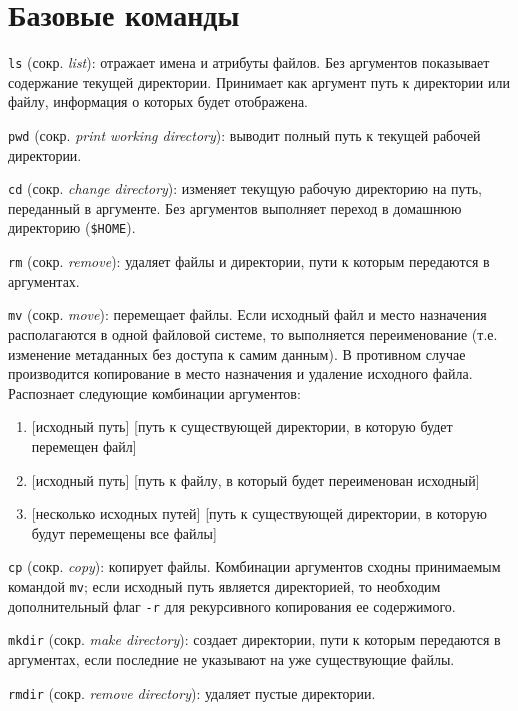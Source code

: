\documentclass[listings]{labreport}
\begin{document}
\maketitlepage


\section*{Базовые команды}

\texttt{ls} (сокр. \textit{list}): отражает имена и атрибуты файлов.
Без аргументов показывает содержание текущей директории. Принимает как аргумент путь к директории или файлу,
информация о которых будет отображена.

\texttt{pwd} (сокр. \textit{print working directory}): выводит полный путь к текущей рабочей директории.

\texttt{cd} (сокр. \textit{change directory}): изменяет текущую рабочую директорию на путь, переданный в аргументе.
Без аргументов выполняет переход в домашнюю директорию (\texttt{\$HOME}).

\texttt{rm} (сокр. \textit{remove}): удаляет файлы и директории, пути к которым передаются в аргументах.

\texttt{mv} (сокр. \textit{move}): перемещает файлы. Если исходный файл и место назначения
располагаются в одной файловой системе, то выполняется переименование (т.е. изменение метаданных без доступа к самим данным).
В противном случае производится копирование в место назначения и удаление исходного файла. Распознает следующие комбинации аргументов:

\begin{enumerate}
\item {[исходный путь]} [путь к существующей директории, в которую будет перемещен файл]
\item {[исходный путь]} [путь к файлу, в который будет переименован исходный]
\item {[несколько исходных путей]} [путь к существующей директории, в которую будут перемещены все файлы]
\end{enumerate}

\texttt{cp} (сокр. \textit{copy}): копирует файлы. Комбинации аргументов сходны принимаемым командой \texttt{mv}; если исходный путь
является директорией, то необходим дополнительный флаг \texttt{-r} для рекурсивного копирования ее содержимого.

\texttt{mkdir} (сокр. \textit{make directory}): создает директории, пути к которым передаются в аргументах, если последние
не указывают на уже существующие файлы.

\texttt{rmdir} (сокр. \textit{remove directory}): удаляет пустые директории.
\end{document}
